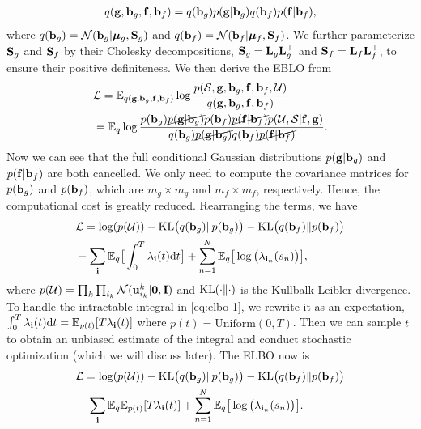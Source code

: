 \begin{align}
q(\g, \b_g, \f, \b_f) = q(\b_g)p(\g|\b_g) q(\b_f) p(\f|\b_f), \label{eq:post}
\end{align}
where $q(\b_g) = \N(\b_g|\bmu_g, \S_g)$ and $q(\b_f) = \N(\b_f|\bmu_f, \S_f)$. We further parameterize $\S_g$ and $\S_f$ by their Cholesky decompositions, $\S_g = \L_g \L_g^\top$ and $\S_f = \L_f \L_f^\top$, to ensure their positive definiteness. We then derive the  EBLO from 
\begin{align}
&\Lcal = \EE_{q(\g, \b_g, \f, \b_f)} \log\frac{p(\Scal, \g, \b_g, \f, \b_f, \Ucal)}{q(\g, \b_g, \f, \b_f)} \notag\\
&=\EE_q \log \frac{p(\b_g)\cancel{p(\g|\b_g)} p(\b_f)\cancel{p(\f|\b_f)}p(\Ucal, \Scal|\f, \g)}{q(\b_g)\cancel{p(\g|\b_g)}q(\b_f) \cancel{p(\f|\b_f)}}. \notag 
\end{align}
Now we can see that the full conditional Gaussian distributions $p(\g|\b_g)$ and $p(\f|\b_f)$ are both cancelled. We only need to compute the covariance matrices for $p(\b_g)$ and $p(\b_f)$, which are $m_g\times m_g$ and $m_f \times m_f$, respectively. Hence, the computational cost is greatly reduced. Rearranging the terms, we have 
\begin{align}
&\Lcal = \log(p(\Ucal)) -\kl\big(q(\b_g) \| p(\b_g)\big) - \kl\big(q(\b_f)\| p(\b_f)\big) \notag \\
& - \sum_{\bi} \EE_q\big[\int_0^T \lambda_{\bi}(t) \d t\big] + \sum_{n=1}^N \EE_q\big[\log\big(\lambda_{\bi_n}(s_n)\big)\big], \label{eq:elbo-1}
\end{align}
where $p(\Ucal) =\prod_k\prod_{i_k} \N(\u_{i_k}^k|\0, \I)$ and $\kl(\cdot \| \cdot)$ is the Kullbalk Leibler divergence. To handle the intractable integral in \eqref{eq:elbo-1}, we rewrite it as an expectation,  $\int_0^T \lambda_\bi(t) \d t = \EE_{p(t)} [T\lambda_\bi(t)]$ where $p(t) = \mathrm{Uniform}(0, T)$.  Then we can sample $t$ to obtain an unbiased estimate of the integral and conduct stochastic optimization (which we will discuss later). The ELBO now is 
\begin{align}
&\Lcal = \log(p(\Ucal)) -\kl\big(q(\b_g) \| p(\b_g)\big) - \kl\big(q(\b_f)\| p(\b_f)\big) \notag \\
& - \sum_{\bi} \EE_q\EE_{p(t)}[T\lambda_{\bi}(t) ] + \sum_{n=1}^N \EE_q\big[\log\big(\lambda_{\bi_n}(s_n)\big)\big]. \label{eq:elbo-2}
\end{align}


